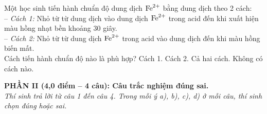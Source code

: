 \documentclass[11pt,a4paper]{article}
\begin{document}
\begin{ex}
Một học sinh tiến hành chuẩn độ dung dịch $\ce{Fe^2+}$ bằng dung dịch  theo 2 cách:\\
-- \textit{Cách 1:} Nhỏ từ từ dung dịch  vào dung dịch $\ce{Fe^2+}$ trong acid đến khi xuất hiện màu hồng nhạt bền khoảng 30 giây.\\
-- \textit{Cách 2:} Nhỏ từ từ dung dịch $\ce{Fe^2+}$ trong acid vào dung dịch  đến khi màu hồng biến mất.\\
Cách tiến hành chuẩn độ nào là phù hợp?
\choice
{\True Cách 1.}
{Cách 2.}
{Cả hai cách.}
{Không có cách nào.}
\end{ex}



\noindent
\textbf{PHẦN II (4,0 điểm -- 4 câu): Câu trắc nghiệm đúng sai.}\\
\textit{Thí sinh trả lời từ câu 1 đến câu 4. Trong mỗi ý a), b), c), d) ở mỗi câu, thí sinh chọn đúng hoặc sai.}

\setcounter{ex}{0}
\end{document}
